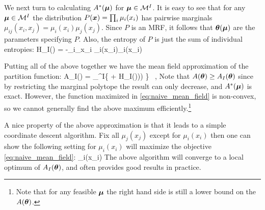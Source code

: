 We next turn to calculating $A^*(\boldsymbol{\mu})$ for $\boldsymbol{\mu}\in{\cal{M}}^{I}$. It is easy to see that for any $\boldsymbol{\mu} \in  {\cal{M}}^{I}$  the distribution $P(\boldsymbol{x}) = \prod_{i} \mu_i(x_i)$ has pairwise marginals $\mu_{ij}(x_i,x_j) =  \mu_i(x_i)\mu_j(x_j)$. Since $P$ is an MRF, it follows that
$\boldsymbol{\theta}(\boldsymbol{\mu})$ are the parameters specifying $P$. Also, the entropy of $P$ is just the sum of individual entropies:
\be
H_{I}(\muv) = -\sum_{i}\sum_{x_i} \mu_i(x_i)\log\mu_i(x_i)
\ee 

Putting all of the above together we have the mean field approximation of the partition function:  
\be
A_{I}(\thetav) = \sup_{\muv \in \margpoly^{I}}\left \{ \muv \cdot \thetav + H_{I}(\muv))) \right\} \label{eq:naive_mean_field}~,
\ee
Note that $A(\boldsymbol{\theta}) \geq A_{I}(\boldsymbol{\theta})$ since by restricting the marginal polytope the result can only decrease, and $A^*(\boldsymbol{\mu})$ is exact. However, the  function maximized in \eqref{eq:naive_mean_field} is non-convex, so we cannot generally find the above maximum efficiently.\footnote{Note that for any feasible $\boldsymbol{\mu}$ the right hand side is still a lower
bound on the $A(\boldsymbol{\theta})$.}

A nice property of the above approximation is that it leads to a simple coordinate descent algorithm. Fix all $\mu_j(x_j)$ except for $\mu_i(x_i)$ then one can show the following setting for $\mu_i(x_i)$ will maximize the objective \eqref{eq:naive_mean_field}:
\be
\mu_i(x_i) \propto {} \label{eq:naive_iter}
\ee
The above algorithm will converge to a local optimum of $A_{I}(\boldsymbol{\theta})$, and often provides good results in practice.




